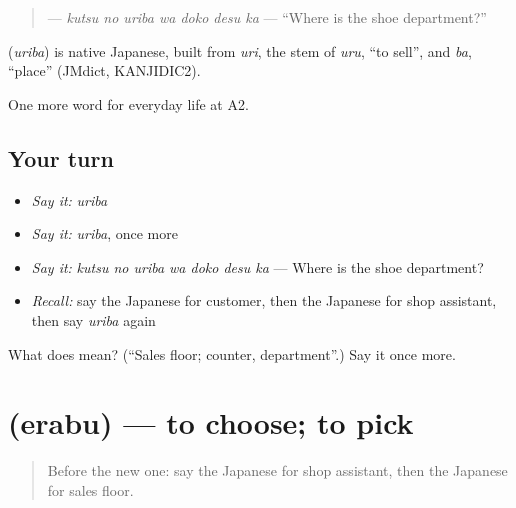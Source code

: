 \begin{quote}
\textbf{  } — \emph{kutsu no uriba wa doko desu ka} — \textquotedblleft{}Where is the shoe department?\textquotedblright{}
\end{quote}

\begin{cousinweb}
\textbf{} (\emph{uriba}) is native Japanese, built from \emph{uri}, the stem of \emph{uru}, \textquotedblleft{}to sell\textquotedblright{}, and \emph{ba}, \textquotedblleft{}place\textquotedblright{} (JMdict, KANJIDIC2).
\end{cousinweb}

\begin{grammarlens}[title={What you've built}]
One more word for everyday life at A2.
\end{grammarlens}

\subsection*{Your turn}
\begin{itemize}
\raggedright
  \item \emph{Say it:} \emph{uriba}
  \item \emph{Say it:} \emph{uriba}, once more
  \item \emph{Say it:} \emph{kutsu no uriba wa doko desu ka} — Where is the shoe department?
  \item \emph{Recall:} say the Japanese for customer, then the Japanese for shop assistant, then say \emph{uriba} again
\end{itemize}

\begin{tcolorbox}[breakable,colback=teal!4,colframe=teal!35!black,title={Before you move on}]
What does  mean? (\textquotedblleft{}Sales floor; counter, department\textquotedblright{}.) Say it once more.
\end{tcolorbox}
\section[\texorpdfstring{\ja{えらぶ} (erabu)}{えらぶ (erabu)}]{ (erabu) — to choose; to pick}

\label{lesson:JA-C183-erabu}



\begin{quote}
Before the new one: say the Japanese for shop assistant, then the Japanese for sales floor.
\end{quote}

